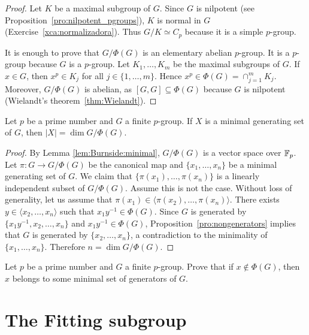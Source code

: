 \begin{proof}
Let $K$ be a maximal subgroup of $G$. Since $G$ is nilpotent 
(see Proposition~\ref{pro:nilpotent_pgroups}), 
$K$ is normal in $G$ (Exercise~\ref{xca:normalizadora}). 
Thus $G/K\simeq C_p$ because it is a simple $p$-group. 
	
It is enough to prove that $G/\Phi(G)$ is an elementary abelian $p$-group. It is a 
$p$-group because $G$ is a $p$-group. Let $K_1,\dots,K_m$ be the maximal subgroups 
of $G$. If $x\in G$, then $x^p\in K_j$ for all $j\in\{1,\dots,m\}$. Hence 
$x^p\in\Phi(G)=\cap_{j=1}^m K_j$. Moreover,  $G/\Phi(G)$ is abelian, as 
$[G,G]\subseteq \Phi(G)$ because $G$ is nilpotent (Wielandt's theorem~\ref{thm:Wielandt}). 
\end{proof}

\begin{theorem}[Burnside]
\label{thm:Burnside:basis}
Let $p$ be a prime number and $G$ a finite $p$-group. If $X$ is a minimal 
generating set of $G$, then $|X|=\dim G/\Phi(G)$. 
\end{theorem}

\begin{proof}
By Lemma \ref{lem:Burnside:minimal}, $G/\Phi(G)$ is a vector space over $\mathbb{F}_p$. 
Let $\pi\colon G\to G/\Phi(G)$ be the canonical map and 
$\{x_1,\dots,x_n\}$ be a minimal generating set of $G$.
We claim that $\{\pi(x_1),\dots,\pi(x_n)\}$ is a linearly independent subset of $G/\Phi(G)$. 
Assume this is not the case. Without loss of generality, let us assume that 
$\pi(x_1)\in\langle \pi(x_2),\dots,\pi(x_n)\rangle$. There exists $y\in
\langle x_2,\dots,x_n\rangle$ such that $x_1y^{-1}\in\Phi(G)$. Since $G$ is generated by 
$\{x_1y^{-1},x_2,\dots,x_n\}$ and $x_1y^{-1}\in\Phi(G)$, Proposition~\ref{pro:nongenerators}
implies that $G$ is generated by 
$\{x_2,\dots,x_n\}$, a contradiction to the minimality of $\{x_1,\dots,x_n\}$. 
Therefore $n=\dim G/\Phi(G)$.
\end{proof}


\begin{exercise}
Let $p$ be a prime number and $G$ a finite $p$-group. Prove that if $x\not\in\Phi(G)$, then 
$x$ belongs to some minimal set of generators of $G$. 
\end{exercise}


\section{The Fitting subgroup}

